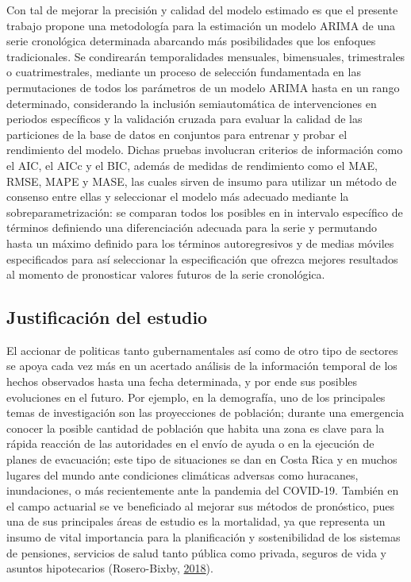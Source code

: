 \documentclass[
]{article}
\begin{document}
Con tal de mejorar la precisión y calidad del modelo estimado es que el
presente trabajo propone una metodología para la estimación un modelo
ARIMA de una serie cronológica determinada abarcando más posibilidades
que los enfoques tradicionales. Se condirearán temporalidades mensuales,
bimensuales, trimestrales o cuatrimestrales, mediante un proceso de
selección fundamentada en las permutaciones de todos los parámetros de
un modelo ARIMA hasta en un rango determinado, considerando la inclusión
semiautomática de intervenciones en periodos específicos y la validación
cruzada para evaluar la calidad de las particiones de la base de datos
en conjuntos para entrenar y probar el rendimiento del modelo. Dichas
pruebas involucran criterios de información como el AIC, el AICc y el
BIC, además de medidas de rendimiento como el MAE, RMSE, MAPE y MASE,
las cuales sirven de insumo para utilizar un método de consenso entre
ellas y seleccionar el modelo más adecuado mediante la
sobreparametrización: se comparan todos los posibles en in intervalo
específico de términos definiendo una diferenciación adecuada para la
serie y permutando hasta un máximo definido para los términos
autoregresivos y de medias móviles especificados para así seleccionar la
especificación que ofrezca mejores resultados al momento de pronosticar
valores futuros de la serie cronológica.

\subsection{Justificación del estudio}

El accionar de politicas tanto gubernamentales así como de otro tipo de
sectores se apoya cada vez más en un acertado análisis de la información
temporal de los hechos observados hasta una fecha determinada, y por
ende sus posibles evoluciones en el futuro. Por ejemplo, en la
demografía, uno de los principales temas de investigación son las
proyecciones de población; durante una emergencia conocer la posible
cantidad de población que habita una zona es clave para la rápida
reacción de las autoridades en el envío de ayuda o en la ejecución de
planes de evacuación; este tipo de situaciones se dan en Costa Rica y en
muchos lugares del mundo ante condiciones climáticas adversas como
huracanes, inundaciones, o más recientemente ante la pandemia del
COVID-19. También en el campo actuarial se ve beneficiado al mejorar sus
métodos de pronóstico, pues una de sus principales áreas de estudio es
la mortalidad, ya que representa un insumo de vital importancia para la
planificación y sostenibilidad de los sistemas de pensiones, servicios
de salud tanto pública como privada, seguros de vida y asuntos
hipotecarios (Rosero-Bixby, \protect\hyperlink{ref-supenprodc}{2018}).
\end{document}
